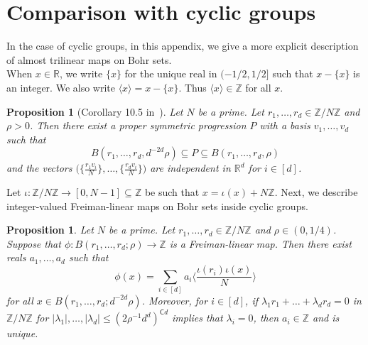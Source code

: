 \documentclass[a4paper,11pt]{article}
\numberwithin{theorem}{section}
\newtheorem{proposition}[theorem]{Proposition}
\theoremstyle{definition}
\newcommand{\lr}[1]{
    \langle #1\rangle
}
\newcommand{\blr}[1]{
    \Big\langle #1\Big\rangle
}
\newcommand{\blc}{\bm{\mathsf{C}}}
\begin{document}
\section{Comparison with cyclic groups}\label{cyclicgroupsappendix}

In the case of cyclic groups, in this appendix, we give a more explicit description of almost trilinear maps on Bohr sets.\\
\indent When $x \in \mathbb{R}$, we write $\{x\}$ for the unique real in $(-1/2, 1/2]$ such that $x - \{x\}$ is an integer. We also write $\lr{x} = x - \{x\}$. Thus $\lr{x} \in \mathbb{Z}$ for all $x$.\\

\begin{proposition}[Corollary 10.5 in~\cite{GreenTaoU3}]\label{goodprogzn}
    Let $N$ be a prime. Let $r_1, \dots, r_d \in \mathbb{Z}/N\mathbb{Z}$ and $\rho > 0$. Then there exist a proper symmetric progression $P$ with a basis $v_1, \dots, v_d$ such that 
    \[B(r_1, \dots, r_d, d^{-2d}\rho) \subseteq P \subseteq B(r_1, \dots, r_d, \rho)\]
    and the vectors $\Big(\Big\{\frac{r_1 v_i}{N}\Big\}, \dots, \Big\{\frac{r_d v_i}{N}\Big\} \Big)$ are independent in $\mathbb{R}^d$ for $i \in [d]$.
\end{proposition}

Let $\iota : \mathbb{Z}/N\mathbb{Z} \to [0, N-1] \subseteq \mathbb{Z}$ be such that $x = \iota(x) + N \mathbb{Z}$. Next, we describe integer-valued Freiman-linear maps on Bohr sets inside cyclic groups.

\begin{proposition}\label{zhommcyclicbohr}
    Let $N$ be a prime. Let $r_1, \dots, r_d \in \mathbb{Z}/N\mathbb{Z}$ and $\rho \in (0, 1/4)$. Suppose that $\phi : B(r_1, \dots, r_d; \rho) \to \mathbb{Z}$ is a Freiman-linear map. Then there exist reals $a_1, \dots, a_d$ such that 
    \[\phi(x) = \sum_{i \in [d]} a_i \blr{\frac{\iota(r_i) \iota(x)}{N}}\]
    for all $x \in B(r_1, \dots, r_d; d^{-2d}\rho)$. Moreover, for $i \in [d]$, if $\lambda_1 r_1 + \dots + \lambda_d r_d = 0$ in $\mathbb{Z}/N\mathbb{Z}$ for $|\lambda_1|, \dots, |\lambda_d| \leq (2\rho^{-1}d^d)^{\blc d}$ implies that $\lambda_i = 0$, then $a_i \in \mathbb{Z}$ and is unique.
\end{proposition}
\end{document}
